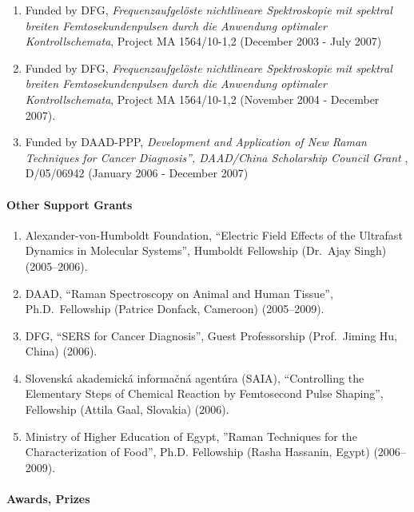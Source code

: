 \begin{enumerate}
\item Funded by DFG, \emph{Frequenzaufgel\"{o}ste nichtlineare Spektroskopie mit spektral breiten Femtosekundenpulsen
durch die Anwendung optimaler Kontrollschemata}, Project MA
1564/10-1,2 (December 2003 - July 2007)

\item Funded by DFG, \emph{Frequenzaufgel\"{o}ste nichtlineare Spektroskopie mit spektral breiten
Femtosekundenpulsen durch die Anwendung optimaler Kontrollschemata},
Project MA 1564/10-1,2 (November 2004 - December 2007).

\item Funded by DAAD-PPP, \emph{Development and Application of New Raman Techniques for Cancer Diagnosis'',
DAAD/China Scholarship Council Grant} ,  D/05/06942  (January 2006 -
December 2007)
\end{enumerate}


\paragraph{Other Support Grants}

\begin{enumerate}

\item Alexander-von-Humboldt Foundation, ``Electric Field Effects of the Ultrafast Dynamics in Molecular Systems'',
Humboldt Fellowship (Dr.\ Ajay Singh) (2005--2006).


\item DAAD, ``Raman Spectroscopy on Animal and Human Tissue'',  Ph.D.\ Fellowship (Patrice Donfack, Cameroon) (2005--2009).

\item DFG, ``SERS for Cancer Diagnosis'', Guest Professorship (Prof.\ Jiming Hu, China) (2006).

\item Slovensk\'{a} akademick\'{a} informa\v{c}n\'{a} agent\'{u}ra (SAIA), ``Controlling the Elementary Steps of Chemical Reaction by Femtosecond Pulse Shaping'', Fellowship (Attila Gaal, Slovakia) (2006).

\item Ministry of Higher Education of Egypt, ''Raman Techniques for the Characterization of Food'', Ph.D. Fellowship (Rasha Hassanin, Egypt) (2006--2009).
\end{enumerate}

\paragraph{Awards, Prizes}

